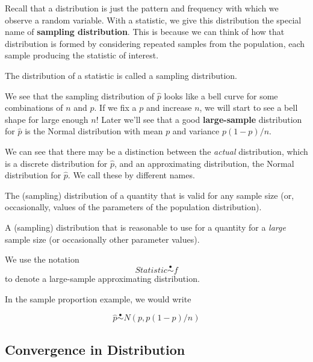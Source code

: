 \documentclass[
]{article}
\providecommand{\tightlist}{%
  \setlength{\itemsep}{0pt}\setlength{\parskip}{0pt}}
\begin{document}
Recall that a distribution is just the pattern and frequency with which
we observe a random variable. With a statistic, we give this
distribution the special name of \textbf{sampling distribution}. This is
because we can think of how that distribution is formed by considering
repeated samples from the population, each sample producing the
statistic of interest.

\begin{description}
\tightlist
\item[Sampling Distribution]
The distribution of a statistic is called a sampling distribution.
\end{description}

We see that the sampling distribution of \(\hat{p}\) looks like a bell
curve for some combinations of \(n\) and \(p\). If we fix a \(p\) and
increase \(n\), we will start to see a bell shape for large enough
\(n\)! Later we'll see that a good \textbf{large-sample} distribution
for \(\hat{p}\) is the Normal distribution with mean \(p\) and variance
\(p(1-p)/n\).

We can see that there may be a distinction between the \emph{actual}
distribution, which is a discrete distribution for \(\hat{p}\), and an
approximating distribution, the Normal distribution for \(\hat{p}\). We
call these by different names.

\begin{description}
\tightlist
\item[Exact Distribution]
The (sampling) distribution of a quantity that is valid for any sample
size (or, occasionally, values of the parameters of the population
distribution).
\item[Large-Sample or Approximate Distribution]
A (sampling) distribution that is reasonable to use for a quantity for a
\emph{large} sample size (or occasionally other parameter values).
\end{description}

We use the notation \[Statistic \stackrel{\bullet}\sim f\] to denote a
large-sample approximating distribution.

In the sample proportion example, we would write

\[\hat{p}\stackrel{\bullet}\sim N(p, p(1-p)/n)\]

\hypertarget{convergence-in-distribution}{%
\subsection{Convergence in
Distribution}\label{convergence-in-distribution}}
\end{document}
